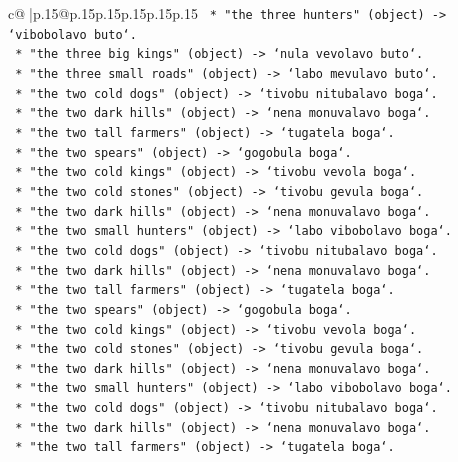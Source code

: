 \documentclass{article}
\begin{document}
{\begin{supertabular}{c@{$\;$}|p{.15\linewidth}@{}p{.15\linewidth}p{.15\linewidth}p{.15\linewidth}p{.15\linewidth}p{.15\linewidth}}
{{{\texttt{        *   "the three hunters" (object) {-}> `vibobolavo buto`.} \\
\texttt{        *   "the three big kings" (object) {-}> `nula vevolavo buto`.} \\
\texttt{        *   "the three small roads" (object) {-}> `labo mevulavo buto`.} \\
\texttt{        *   "the two cold dogs" (object) {-}> `tivobu nitubalavo boga`.} \\
\texttt{        *   "the two dark hills" (object) {-}> `nena monuvalavo boga`.} \\
\texttt{        *   "the two tall farmers" (object) {-}> `tugatela boga`.} \\
\texttt{        *   "the two spears" (object) {-}> `gogobula boga`.} \\
\texttt{        *   "the two cold kings" (object) {-}> `tivobu vevola boga`.} \\
\texttt{        *   "the two cold stones" (object) {-}> `tivobu gevula boga`.} \\
\texttt{        *   "the two dark hills" (object) {-}> `nena monuvalavo boga`.} \\
\texttt{        *   "the two small hunters" (object) {-}> `labo vibobolavo boga`.} \\
\texttt{        *   "the two cold dogs" (object) {-}> `tivobu nitubalavo boga`.} \\
\texttt{        *   "the two dark hills" (object) {-}> `nena monuvalavo boga`.} \\
\texttt{        *   "the two tall farmers" (object) {-}> `tugatela boga`.} \\
\texttt{        *   "the two spears" (object) {-}> `gogobula boga`.} \\
\texttt{        *   "the two cold kings" (object) {-}> `tivobu vevola boga`.} \\
\texttt{        *   "the two cold stones" (object) {-}> `tivobu gevula boga`.} \\
\texttt{        *   "the two dark hills" (object) {-}> `nena monuvalavo boga`.} \\
\texttt{        *   "the two small hunters" (object) {-}> `labo vibobolavo boga`.} \\
\texttt{        *   "the two cold dogs" (object) {-}> `tivobu nitubalavo boga`.} \\
\texttt{        *   "the two dark hills" (object) {-}> `nena monuvalavo boga`.} \\
\texttt{        *   "the two tall farmers" (object) {-}> `tugatela boga`.} \\
}}}
\end{supertabular}}
\end{document}
